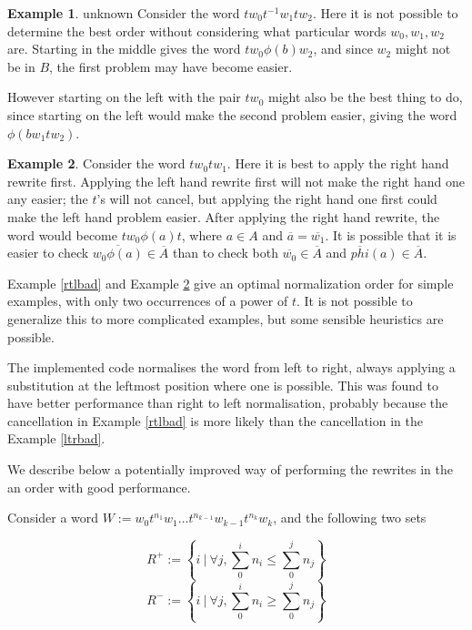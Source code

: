 \documentclass[11pt]{article} %
\theoremstyle{definition}
\theoremstyle{definition}
\theoremstyle{definition}
\theoremstyle{definition}
\theoremstyle{definition}
\theoremstyle{definition}
\newtheorem{exmpl}{Example}[theorem]
\begin{document}
\begin{exmpl}{unknown}
  Consider the word $tw_0t^{-1}w_1tw_2$. Here it is not possible to determine the best order without
  considering what particular words $w_0, w_1, w_2$ are. Starting in the middle gives the word
  $tw_0\phi(b)w_2$, and since $w_2$ might not be in $B$, the first problem may have become easier.

  However starting on the left with the pair $tw_0$
  might also be the best thing to do, since starting on the left would
  make the second problem easier, giving the word $\phi(bw_1 t w_2)$.
\end{exmpl}

\begin{exmpl}\label{ltrbad2}
  Consider the word $tw_0tw_1$. Here it is best to apply the right hand rewrite first.
  Applying the left hand rewrite first will not make the right hand one any easier; the $t$'s will
  not cancel, but applying the right hand one first could make the left hand problem easier.
  After applying the right hand rewrite, the word would become $tw_0\phi(a)t$, where $a \in A$
  and $\overline{a} = \overline{w_1}$. It is possible that it is easier to check $\overline{w_0\phi(a)} \in \overline{A}$
  than to check both $\overline{w_0} \in \overline{A}$ and $\overline{phi}(a) \in \overline{A}$.
\end{exmpl}

Example \ref{rtlbad} and Example \ref{ltrbad2} give an optimal normalization order
for simple examples, with only two occurrences of a power of $t$.
It is not possible to generalize this to more complicated examples,
but some sensible heuristics are possible.

The implemented code normalises the word from left to right, always applying
a substitution at the leftmost position where one is possible. This was found to have better
performance than right to left normalisation, probably because the cancellation
in Example \ref{rtlbad} is more likely than the cancellation in the Example \ref{ltrbad}.

We describe below a potentially improved way of performing the rewrites in the
an order with good performance.

Consider a word $W := w_0t^{n_1}w_1 \dots t^{n_{k-1}}w_{k-1}t^{n_k}w_k$, and the
following two sets

\begin{equation}
    R^{+} := \left\{ i \ | \ \forall j, \sum_0^i n_i \le \sum_0^j n_j\right\}
\end{equation}
\begin{equation}
    R^{-} := \left\{ i \ | \ \forall j, \sum_0^i n_i \ge \sum_0^j n_j\right\}
\end{equation}
\end{document}
